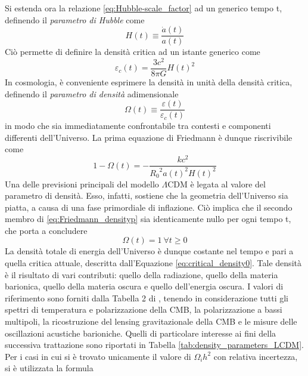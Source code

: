 Si estenda ora la relazione \ref{eq:Hubble-scale_factor} ad un generico tempo t, definendo il \emph{parametro di Hubble} come 
\begin{equation}
    H(t) \equiv \frac{\dot{a}(t)}{a(t)}
    \label{eq:Hubble_parameter}
\end{equation}
Ciò permette di definire la densità critica ad un istante generico come
\begin{equation}
    \varepsilon_c(t) = \frac{3c^2}{8\pi G} H(t)^2
    \label{eq:critical_density}
\end{equation}
In cosmologia, è conveniente esprimere la densità in unità della densità critica, definendo il \emph{parametro di densità} adimensionale
\begin{equation}
    \Omega(t) \equiv \frac{\varepsilon(t)}{\varepsilon_c(t)}
    \label{eq:density_parameter}
\end{equation}
in modo che sia immediatamente confrontabile tra contesti e componenti differenti dell'Universo. 
La prima equazione di Friedmann è dunque riscrivibile come 
\begin{equation}
    1-\Omega(t)=-\frac{kc^2}{{R_0}^2a(t)^2H(t)^2}
    \label{eq:Friedmann_densityp}
\end{equation}
Una delle previsioni principali del modello $\Lambda$CDM è legata al valore del parametro di densità. Esso, infatti, sostiene che la geometria dell'Universo sia piatta, a causa di una fase primordiale di inflazione. Ciò implica che il secondo membro di \ref{eq:Friedmann_densityp} sia identicamente nullo per ogni tempo t, che porta a concludere 
\begin{equation}
    \Omega(t)=1\ \forall t\ge 0
    \label{eq:omega_tot}
\end{equation}
La densità totale di energia dell'Universo è dunque costante nel tempo e pari a quella critica attuale, descritta dall'Equazione \ref{eq:critical_density0}. Tale densità è il risultato di vari contributi: quello della radiazione, quello della materia barionica, quello della materia oscura e quello dell'energia oscura. I valori di riferimento sono forniti dalla Tabella 2 di \textcite{Planck2018}, tenendo in considerazione tutti gli spettri di temperatura e polarizzazione della CMB, la polarizzazione a bassi multipoli, la ricostruzione del lensing gravitazionale della CMB e le misure delle oscillazioni acustiche barioniche. Quelli di particolare interesse ai fini della successiva trattazione sono riportati in Tabella \ref{tab:density_parameters_LCDM}.
Per i casi in cui si è trovato unicamente il valore di $\Omega_i h^2$ con relativa incertezza, si è utilizzata la formula 
